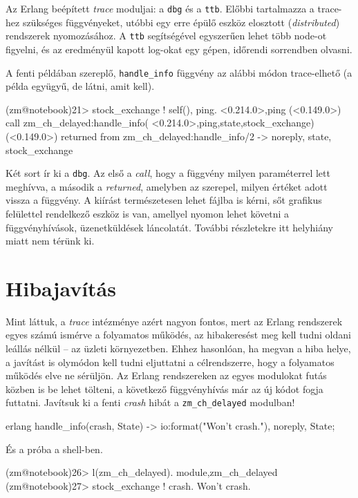 \documentclass[12pt, a4paper, oneside]{book}
\begin{document}
Az Erlang beépített \emph{trace} moduljai: a \texttt{dbg} és a \texttt{ttb}.
Előbbi tartalmazza a trace-hez szükséges függvényeket, utóbbi egy erre épülő
eszköz elosztott (\emph{distributed}) rendszerek nyomozásához. A \texttt{ttb}
segítségével egyszerűen lehet több node-ot figyelni, és az eredményül kapott
log-okat egy gépen, időrendi sorrendben olvasni.

A fenti példában szereplő, \texttt{handle\_info} függvény
az alábbi módon trace-elhető (a példa együgyű, de látni, amit kell).

\begin{code}{}{}
(zm@notebook)21> stock_exchange ! {self(), ping}.
{<0.214.0>,ping}
(<0.149.0>) call zm_ch_delayed:handle_info(
                 {<0.214.0>,ping},{state,stock_exchange})
(<0.149.0>) returned from zm_ch_delayed:handle_info/2 -> 
                 {noreply, {state, stock_exchange}}
\end{code}

Két sort ír ki a \texttt{dbg}. Az első a \emph{call}, hogy a függvény milyen
paraméterrel lett meghívva, a második a \emph{returned}, amelyben az szerepel,
milyen értéket adott vissza a függvény. A kiírást természetesen lehet fájlba is
kérni, sőt grafikus felülettel rendelkező eszköz is van, amellyel nyomon lehet
követni a függvényhívások, üzenetküldések láncolatát. További részletekre itt
helyhiány miatt nem térünk ki.

\section{Hibajavítás}
Mint láttuk, a \emph{trace} intézménye azért nagyon fontos, mert az
Erlang rendszerek egyes számú ismérve a folyamatos működés, az hibakeresést meg
kell tudni oldani leállás nélkül -- az üzleti környezetben. Ehhez hasonlóan, ha
megvan a hiba helye, a javítást is olymódon kell tudni eljuttatni a
célrendszerre, hogy a folyamatos működés elve ne sérüljön. Az Erlang
rendszereken az egyes modulokat futás közben is be lehet tölteni, a következő
függvényhívás már az új kódot fogja futtatni. Javítsuk ki a fenti \emph{crash}
hibát a \texttt{zm\_ch\_delayed} modulban!

\begin{code}{erlang}{}
handle_info(crash, State) ->
  io:format("Won't crash.\n"),
  {noreply, State};
\end{code} 

És a próba a shell-ben.

\begin{code}{}{}
(zm@notebook)26> l(zm_ch_delayed).               
{module,zm_ch_delayed}
(zm@notebook)27> stock_exchange ! crash.
Won't crash.
\end{code}
\end{document}
